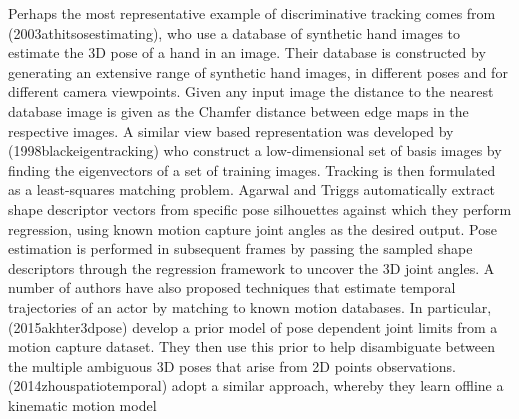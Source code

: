 Perhaps the most representative example of discriminative tracking comes from (2003athitsosestimating), who use a database of synthetic hand images to estimate the 3D pose of a hand in an image. Their database is constructed by generating an extensive range of synthetic hand images, in different poses and for different camera viewpoints. Given any input image the distance to the nearest database image is given as the Chamfer distance between edge maps in the respective images. A similar view based representation was developed by (1998blackeigentracking) who construct a low-dimensional set of basis images by finding the eigenvectors of a set of training images. Tracking is then formulated as a least-squares matching problem. Agarwal and Triggs automatically extract shape descriptor vectors from specific pose silhouettes against which they perform regression, using known motion capture joint angles as the desired output. Pose estimation is performed in subsequent frames by passing the sampled shape descriptors through the regression framework to uncover the 3D joint angles. A number of authors have also proposed techniques that estimate temporal trajectories of an actor by matching to known motion databases. In particular, (2015akhter3dpose) develop a prior model of pose dependent joint limits from a motion capture dataset. They then use this prior to help disambiguate between the multiple ambiguous 3D poses that arise from 2D points observations. (2014zhouspatiotemporal) adopt a similar approach, whereby they learn offline a kinematic motion model 

